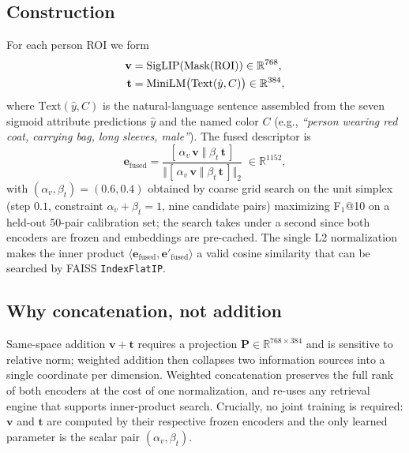 ﻿\documentclass[conference]{IEEEtran}
\theoremstyle{definition}
\begin{document}
\subsection{Construction}
For each person ROI we form
\begin{align}
\mathbf{v} &= \mathrm{SigLIP}(\mathrm{Mask}(\mathrm{ROI})) \in\mathbb{R}^{768}, \notag\\
\mathbf{t} &= \mathrm{MiniLM}\bigl(\mathrm{Text}(\hat{y}, C)\bigr) \in\mathbb{R}^{384},
\end{align}
where $\mathrm{Text}(\hat{y}, C)$ is the natural-language sentence assembled from the seven sigmoid attribute predictions $\hat{y}$ and the named color $C$ (e.g., \textit{``person wearing red coat, carrying bag, long sleeves, male''}). The fused descriptor is
\begin{equation}
\mathbf{e}_{\text{fused}} = \frac{[\,\alpha_v\,\mathbf{v}\;\Vert\;\beta_t\,\mathbf{t}\,]}{\bigl\Vert [\,\alpha_v\,\mathbf{v}\;\Vert\;\beta_t\,\mathbf{t}\,]\bigr\Vert_2}\;\in\mathbb{R}^{1152},
\label{eq:fusion}
\end{equation}
with $(\alpha_v,\beta_t)=(0.6, 0.4)$ obtained by coarse grid search on the unit simplex (step $0.1$, constraint $\alpha_v+\beta_t=1$, nine candidate pairs) maximizing F$_1$@10 on a held-out 50-pair calibration set; the search takes under a second since both encoders are frozen and embeddings are pre-cached. The single L2 normalization makes the inner product $\langle\mathbf{e}_{\text{fused}}, \mathbf{e}'_{\text{fused}}\rangle$ a valid cosine similarity that can be searched by FAISS \texttt{IndexFlatIP}.

\subsection{Why concatenation, not addition}
Same-space addition $\mathbf{v}+\mathbf{t}$ requires a projection $\mathbf{P}\in\mathbb{R}^{768\times 384}$ and is sensitive to relative norm; weighted addition then collapses two information sources into a single coordinate per dimension. Weighted concatenation preserves the full rank of both encoders at the cost of one normalization, and re-uses any retrieval engine that supports inner-product search. Crucially, no joint training is required: $\mathbf{v}$ and $\mathbf{t}$ are computed by their respective frozen encoders and the only learned parameter is the scalar pair $(\alpha_v,\beta_t)$.
\end{document}
